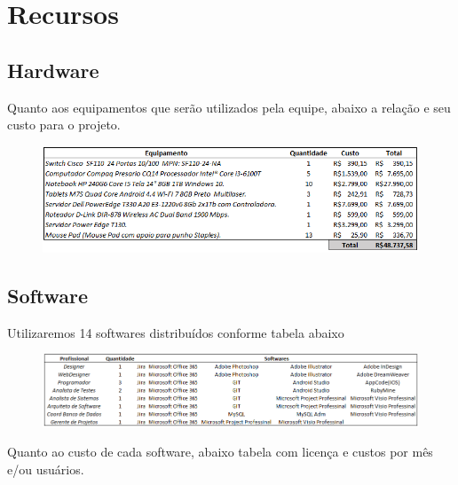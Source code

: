 \chapter[Recursos]{Recursos}

\section[Hardware]{Hardware}

Quanto aos equipamentos que serão utilizados pela equipe, abaixo a relação e seu custo para o projeto.

\begin{figure}[htb]
	\begin{center}
	    \includegraphics[scale=0.7]{figuras/custoHardware}
	\end{center}
\end{figure}

\section[Software]{Software}

Utilizaremos 14 softwares distribuídos conforme tabela abaixo

\begin{figure}[htb]
	\begin{center}
	    \includegraphics[scale=0.6]{figuras/relacaoSoftwares}
	\end{center}
\end{figure}

Quanto ao custo de cada software, abaixo tabela com licença e custos por mês e/ou usuários.

